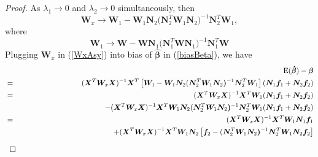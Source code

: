 \documentclass[article,lineno]{biometrika}
\begin{document}
\begin{proof}
As $\lambda_1 \to 0$ and $\lambda_2 \to 0$ simultaneously, then  
\begin{equation} \label{WxAsy}
\boldsymbol W_x  \to  \boldsymbol W_1 
-
\boldsymbol W_1 \boldsymbol N_2 
(\boldsymbol N_2^T  \boldsymbol W_1 \boldsymbol N_2 \boldsymbol )^{-1} 
\boldsymbol N_2^T  \boldsymbol W_1,
\end{equation}
where 
\begin{equation} \label{W1Asy}
 \boldsymbol W_1 \to
\boldsymbol W 
-
\boldsymbol W \boldsymbol N_1 
(\boldsymbol N_1^T  \boldsymbol W \boldsymbol N_1 \boldsymbol)^{-1} 
\boldsymbol N_1^T  \boldsymbol W
\end{equation}
Plugging $\bm W_x$ in (\ref{WxAsy}) into bias of $\bm {\hat \beta}$ in (\ref{biasBeta}), we have 
\begin{eqnarray}
&& 
{\rm E}(\boldsymbol {\hat \beta})  -  \boldsymbol \beta  \nonumber \\
&=& 
(\boldsymbol X^T  \boldsymbol W_x \boldsymbol X )^{-1} \boldsymbol X^T 
\left[\boldsymbol W_1 
-
\boldsymbol W_1 \boldsymbol N_2 
(\boldsymbol N_2^T  \boldsymbol W_1 \boldsymbol N_2 \boldsymbol )^{-1} 
\boldsymbol N_2^T  \boldsymbol W_1 \right] 
(\boldsymbol N_{1} \boldsymbol f_1 + 
\boldsymbol N_{2} \boldsymbol f_2) \nonumber\\
&=& 
(\boldsymbol X^T  \boldsymbol W_x \boldsymbol X )^{-1} \boldsymbol X^T 
\boldsymbol W_1 (\boldsymbol N_{1} \boldsymbol f_1 + 
\boldsymbol N_{2} \boldsymbol f_2) \nonumber\\
&& \hspace{4cm}
-
(\boldsymbol X^T  \boldsymbol W_x \boldsymbol X )^{-1} \boldsymbol X^T
\boldsymbol W_1 \boldsymbol N_2 
(\boldsymbol N_2^T  \boldsymbol W_1 \boldsymbol N_2 \boldsymbol )^{-1} 
\boldsymbol N_2^T  \boldsymbol W_1 
(\boldsymbol N_{1} \boldsymbol f_1 + 
\boldsymbol N_{2} \boldsymbol f_2) \nonumber\\
&=& 
(\boldsymbol X^T  \boldsymbol W_x \boldsymbol X )^{-1} \boldsymbol X^T 
\boldsymbol W_1 \boldsymbol N_{1} \boldsymbol f_1 \nonumber\\
&& 
+ 
(\boldsymbol X^T  \boldsymbol W_x \boldsymbol X )^{-1} \boldsymbol X^T 
\boldsymbol W_1 \boldsymbol N_{2} 
\left[\boldsymbol f_2 - (\boldsymbol N_2^T  \boldsymbol W_1 \boldsymbol N_2 \boldsymbol )^{-1} 
\boldsymbol N_2^T  \boldsymbol W_1 
\boldsymbol N_{2} \boldsymbol f_2 \right] \nonumber\\ 

\end{eqnarray}
\end{proof}
\end{document}
